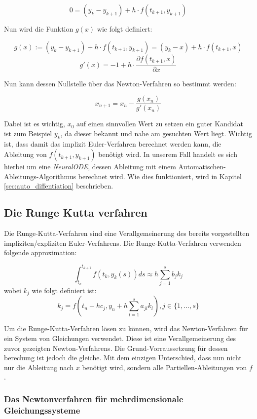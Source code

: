 $$
0 = (y_k - y_{k + 1})  + h \cdot f(t_{k + 1}, y_{k + 1})
$$

Nun wird die Funktion $g(x)$ wie folgt definiert:

$$
g(x) := (y_k - y_{k + 1})  + h \cdot f(t_{k + 1}, y_{k + 1}) = (y_k - x)  + h \cdot f(t_{k + 1}, x)
$$
$$
g'(x) = -1 + h \cdot \frac{\partial f(t_{k+1}, x)}{\partial x}
$$

Nun kann dessen Nullstelle über das Newton-Verfahren so bestimmt werden:

$$
x_{n+1} = x_{n} - \frac{g(x_n)}{g'(x_n)}
$$

Dabei ist es wichtig, $x_{0}$ auf einen sinnvollen Wert zu setzen ein guter Kandidat ist zum Beispiel
$y_{k}$, da dieser bekannt und nahe am gesuchten Wert liegt.
Wichtig ist, dass damit das implizit Euler-Verfahren berechnet werden kann, die Ableitung von $f(t_{k + 1}, y_{k + 1})$ benötigt wird.
In unserem Fall handelt es sich hierbei um eine \textit{NeuralODE}, dessen Ableitung mit einem Automatischen-Ableitungs-Algorithmus berechnet wird. 
Wie dies funktioniert, wird in Kapitel \ref{sec:auto_diffentiation} beschrieben.

\subsection{Die Runge Kutta verfahren} \label{sec:runge_kutta}

Die Runge-Kutta-Verfahren \cite[Kapitel~II.1]{ode1} sind eine Verallgemeinerung des
bereits vorgestellten impliziten/expliziten Euler-Verfahrens.
Die Runge-Kutta-Verfahren verwenden folgende approximation:

$$
\int_{t_k}^{t_{k+1}} f(t_k, y_k(s)) ds \approx h \sum_{j=1}^{s} b_j k_j
$$
wobei $k_j$ wie folgt definiert ist:
$$
k_j = f(t_n + h c_j, y_n + h \sum_{l=1}^{s}a_{jl}k_{l}) , j \in \{1, ..., s\}
$$


Um die Runge-Kutta-Verfahren lösen zu können, wird das Newton-Verfahren für ein 
System von Gleichungen verwendet.
Diese ist eine Verallgemeinerung des zuvor gezeigten Newton-Verfahrens.
Die Grund-Vorraussetzung für dessen berechung ist jedoch die gleiche.
Mit dem einzigen Unterschied, dass nun nicht nur die Ableitung nach $x$ benötigt wird, sondern alle Partiellen-Ableitungen von $f$.

\subsubsection{Das Newtonverfahren für mehrdimensionale Gleichungssysteme}

